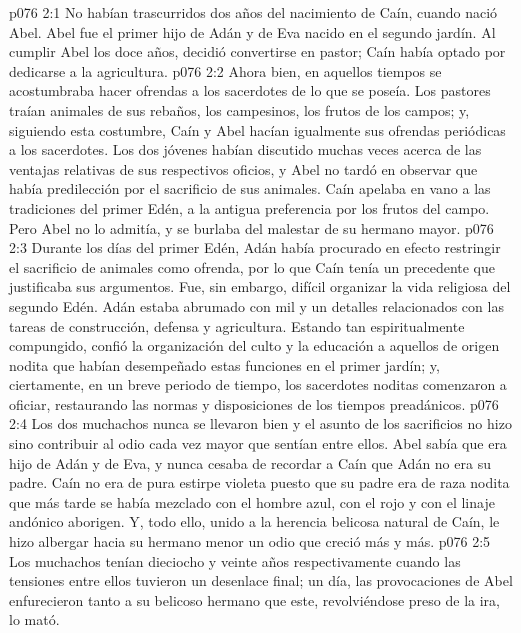 \vs p076 2:1 No habían trascurridos dos años del nacimiento de Caín, cuando nació Abel. Abel fue el primer hijo de Adán y de Eva nacido en el segundo jardín. Al cumplir Abel los doce años, decidió convertirse en pastor; Caín había optado por dedicarse a la agricultura.
\vs p076 2:2 Ahora bien, en aquellos tiempos se acostumbraba hacer ofrendas a los sacerdotes de lo que se poseía. Los pastores traían animales de sus rebaños, los campesinos, los frutos de los campos; y, siguiendo esta costumbre, Caín y Abel hacían igualmente sus ofrendas periódicas a los sacerdotes. Los dos jóvenes habían discutido muchas veces acerca de las ventajas relativas de sus respectivos oficios, y Abel no tardó en observar que había predilección por el sacrificio de sus animales. Caín apelaba en vano a las tradiciones del primer Edén, a la antigua preferencia por los frutos del campo. Pero Abel no lo admitía, y se burlaba del malestar de su hermano mayor.
\vs p076 2:3 Durante los días del primer Edén, Adán había procurado en efecto restringir el sacrificio de animales como ofrenda, por lo que Caín tenía un precedente que justificaba sus argumentos. Fue, sin embargo, difícil organizar la vida religiosa del segundo Edén. Adán estaba abrumado con mil y un detalles relacionados con las tareas de construcción, defensa y agricultura. Estando tan espiritualmente compungido, confió la organización del culto y la educación a aquellos de origen nodita que habían desempeñado estas funciones en el primer jardín; y, ciertamente, en un breve periodo de tiempo, los sacerdotes noditas comenzaron a oficiar, restaurando las normas y disposiciones de los tiempos preadánicos.
\vs p076 2:4 Los dos muchachos nunca se llevaron bien y el asunto de los sacrificios no hizo sino contribuir al odio cada vez mayor que sentían entre ellos. Abel sabía que era hijo de Adán y de Eva, y nunca cesaba de recordar a Caín que Adán no era su padre. Caín no era de pura estirpe violeta puesto que su padre era de raza nodita que más tarde se había mezclado con el hombre azul, con el rojo y con el linaje andónico aborigen. Y, todo ello, unido a la herencia belicosa natural de Caín, le hizo albergar hacia su hermano menor un odio que creció más y más.
\vs p076 2:5 Los muchachos tenían dieciocho y veinte años respectivamente cuando las tensiones entre ellos tuvieron un desenlace final; un día, las provocaciones de Abel enfurecieron tanto a su belicoso hermano que este, revolviéndose preso de la ira, lo mató.
